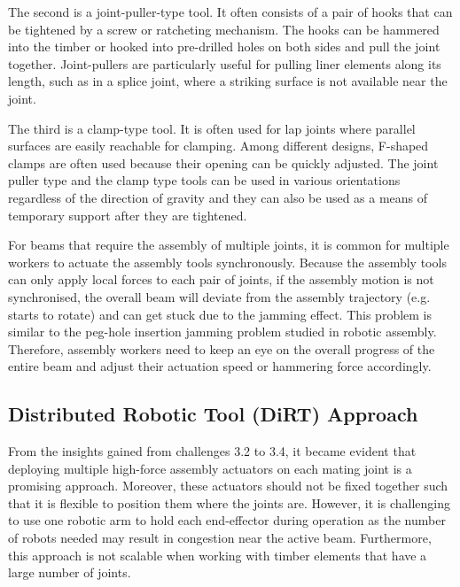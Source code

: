 The second is a joint-puller-type tool. It often consists of a pair of hooks that can be tightened by a screw or ratcheting mechanism. The hooks can be hammered into the timber or hooked into pre-drilled holes on both sides and pull the joint together. Joint-pullers are particularly useful for pulling liner elements along its length, such as in a splice joint, where a striking surface is not available near the joint. 

The third is a clamp-type tool. It is often used for lap joints where parallel surfaces are easily reachable for clamping. Among different designs, F-shaped clamps are often used because their opening can be quickly adjusted. The joint puller type and the clamp type tools can be used in various orientations regardless of the direction of gravity and they can also be used as a means of temporary support after they are tightened. 

For beams that require the assembly of multiple joints, it is common for multiple workers to actuate the assembly tools synchronously. Because the assembly tools can only apply local forces to each pair of joints, if the assembly motion is not synchronised, the overall beam will deviate from the assembly trajectory (e.g. starts to rotate) and can get stuck due to the jamming effect. This problem is similar to the peg-hole insertion jamming problem studied in robotic assembly. \parencite{dupontJammingWedgingConstrained1994} Therefore, assembly workers need to keep an eye on the overall progress of the entire beam and adjust their actuation speed or hammering force accordingly. 

\subsection{Distributed Robotic Tool (DiRT) Approach}
\label{subsection:exploration-1-distributed-robotic-tool-approach}

From the insights gained from challenges 3.2 to 3.4, it became evident that deploying multiple high-force assembly actuators on each mating joint is a promising approach. Moreover, these actuators should not be fixed together such that it is flexible to position them where the joints are. However, it is challenging to use one robotic arm to hold each end-effector during operation as the number of robots needed may result in congestion near the active beam. Furthermore, this approach is not scalable when working with timber elements that have a large number of joints. 


